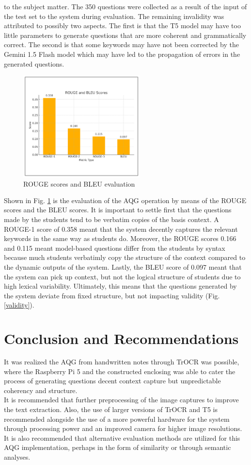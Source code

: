 \documentclass[conference]{IEEEtran}
\begin{document}
to the subject matter. The 350 questions were
collected as a result of the input of the test set to the 
system during evaluation. The remaining invalidity was attributed to 
possibly two aspects. The first is that the T5 model may have too little 
parameters to generate questions that are more coherent and 
grammatically correct. The second is that some keywords may have not been 
corrected by the Gemini 1.5 Flash model which may have led to the
propagation of errors in the generated questions.
\begin{figure}[H]
    \centerline{\includegraphics[width=2.5in]{eval.png}}
    \vspace{-0.3cm}
    \caption{ROUGE scores and BLEU evaluation} 
    \label{eval}
\end{figure}
\vspace{-0.3cm}
Shown in Fig. \ref{eval} is the evaluation of the AQG operation by means
of the ROUGE scores and the BLEU scores. 
It is important to settle first that the questions made by the 
students tend to be verbatim copies of the basis context. 
A ROUGE-1 score of 0.358 meant that the system decently captures 
the relevant keywords in the same way as students do. 
Moreover, the ROUGE scores 0.166
and 0.115 meant model-based questions differ from the 
students by syntax
because much students verbatimly copy 
the structure of the context compared to the dynamic outputs 
of the system. Lastly, the BLEU score of 0.097 meant that 
the system can pick up context, but not the logical structure 
of students due to high lexical variability. Ultimately, this means 
that the questions generated by the system deviate from fixed structure, 
but not impacting validity (Fig. \ref{validity}).

\section{Conclusion and Recommendations}
\indent It was realized the AQG from handwritten notes 
through TrOCR was possible, where the Raspberry Pi 5 
and the constructed enclosing
was able to cater the process of generating
questions decent context capture but unpredictable coherency and 
structure. \\
\indent It is recommended that further preprocessing of the image 
captures to improve the text extraction. Also, 
the use of larger versions of TrOCR and T5 is recommended 
alongside the use of a more powerful hardware for the system
through processing power and an improved camera for 
higher image resolutions. It is also recommended that 
alternative evaluation methods are utilized for this AQG 
implementation, perhaps in the form of similarity or through 
semantic analyses.





\end{document}
